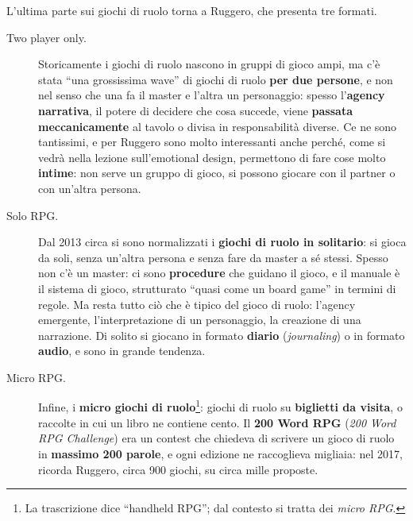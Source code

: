 

L'ultima parte sui giochi di ruolo torna a Ruggero, che presenta tre formati.

\begin{description}
  \item[Two player only.] Storicamente i giochi di ruolo nascono in gruppi di
        gioco ampi, ma c'è stata ``una grossissima wave'' di giochi di ruolo
        \textbf{per due persone}, e non nel senso che una fa il master e l'altra
        un personaggio: spesso l'\textbf{agency narrativa}, il potere di decidere
        che cosa succede, viene \textbf{passata meccanicamente} al tavolo o
        divisa in responsabilità diverse. Ce ne sono tantissimi, e per Ruggero
        sono molto interessanti anche perché, come si vedrà nella lezione
        sull'emotional design, permettono di fare cose molto \textbf{intime}: non
        serve un gruppo di gioco, si possono giocare con il partner o con
        un'altra persona.
  \item[Solo RPG.] Dal 2013 circa si sono normalizzati i \textbf{giochi di
        ruolo in solitario}: si gioca da soli, senza un'altra persona e senza
        fare da master a sé stessi. Spesso non c'è un master: ci sono
        \textbf{procedure} che guidano il gioco, e il manuale è il sistema di
        gioco, strutturato ``quasi come un board game'' in termini di regole. Ma
        resta tutto ciò che è tipico del gioco di ruolo: l'agency emergente,
        l'interpretazione di un personaggio, la creazione di una narrazione. Di
        solito si giocano in formato \textbf{diario} (\emph{journaling}) o in
        formato \textbf{audio}, e sono in grande tendenza.
  \item[Micro RPG.] Infine, i \textbf{micro giochi di ruolo}\footnote{La
        trascrizione dice ``handheld RPG''; dal contesto si tratta dei
        \emph{micro RPG}.}: giochi di ruolo su \textbf{biglietti da visita}, o
        raccolte in cui un libro ne contiene cento. Il \textbf{200 Word RPG}
        (\emph{200 Word RPG Challenge}) era un contest che chiedeva di scrivere un
        gioco di ruolo in \textbf{massimo 200 parole}, e ogni edizione ne
        raccoglieva migliaia: nel 2017, ricorda Ruggero, circa 900 giochi, su
        circa mille proposte.
\end{description}

